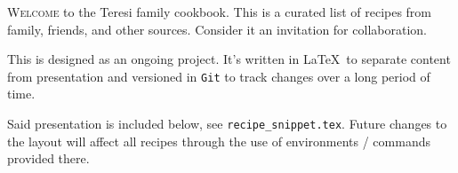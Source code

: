 \lettrine{W}{elcome} to the Teresi family cookbook.
This is a curated list of recipes from family, friends, and other sources.
Consider it an invitation for collaboration.

This is designed as an ongoing project.
It's written in \LaTeX\ to separate content from presentation and versioned in \texttt{Git} to track changes over a long period of time.

Said presentation is included below, see \texttt{recipe\_snippet.tex}.
Future changes to the layout will affect all recipes through the use of environments / commands provided there.

